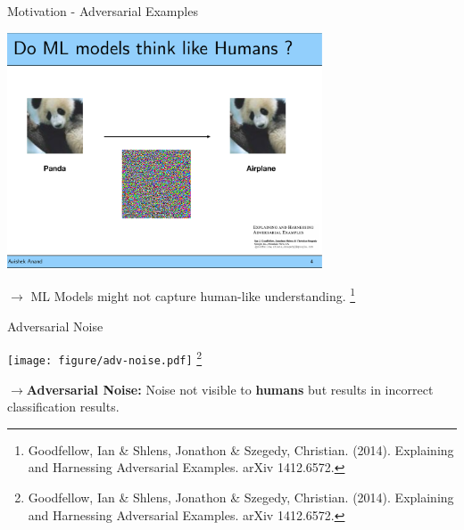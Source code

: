 \documentclass[11pt,compress,t,notes=noshow, aspectratio=169, xcolor=table]{beamer}
\begin{document}
\begin{frame}{Motivation - Adversarial Examples}
    
    \begin{center}
    \includegraphics[width=0.7\textwidth]{figure/panda-airplane.pdf}
    \end{center}
	\bigskip
	
	$\rightarrow$ ML Models might not capture human-like understanding.        
    \footnote[frame]{Goodfellow, Ian \& Shlens, Jonathon \& Szegedy, Christian. (2014). Explaining and Harnessing Adversarial Examples. arXiv 1412.6572.}
\end{frame}

	
\begin{frame}{Adversarial Noise}
    \begin{center}
    \texttt{[image: figure/adv-noise.pdf]}    \footnote[frame]{Goodfellow, Ian \& Shlens, Jonathon \& Szegedy, Christian. (2014). Explaining and Harnessing Adversarial Examples. arXiv 1412.6572.}
	\end{center}
	\normalsize
	$\rightarrow$\textbf{Adversarial Noise:} Noise not visible to \textbf{humans} but results in incorrect classification results.
\end{frame}

\endlecture
\end{document}
